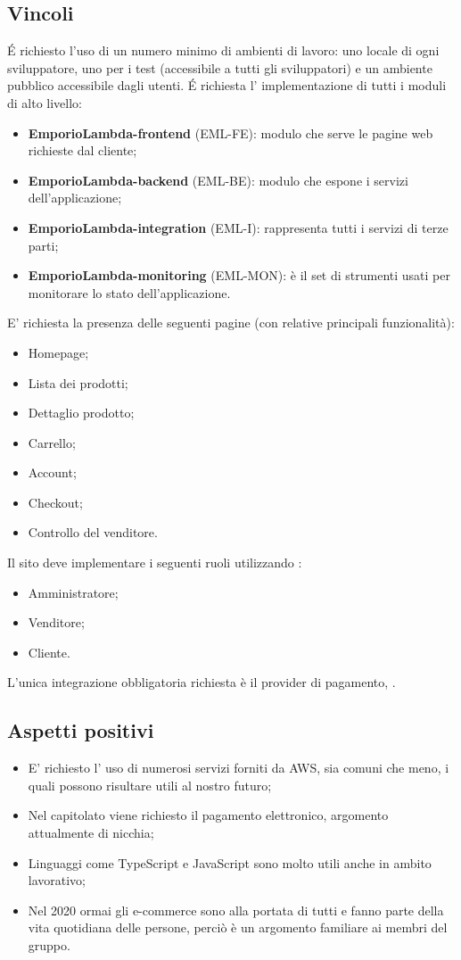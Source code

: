 \subsection{Vincoli}
É richiesto l'uso di un numero minimo di ambienti di lavoro: uno locale di ogni sviluppatore, uno per i test (accessibile a tutti gli sviluppatori) e un ambiente pubblico accessibile dagli utenti.
É richiesta l' implementazione di tutti i moduli di alto livello:
\begin{itemize}
\item	\textbf{EmporioLambda-frontend} (EML-FE): modulo che serve le pagine web richieste dal cliente;
\item	\textbf{EmporioLambda-backend} (EML-BE): modulo che espone i servizi dell'applicazione;
\item	\textbf{EmporioLambda-integration} (EML-I): rappresenta tutti i servizi di terze parti;
\item	\textbf{EmporioLambda-monitoring} (EML-MON): è il set di strumenti usati per monitorare lo stato dell'applicazione.
\end{itemize}
E' richiesta la presenza delle seguenti pagine (con relative principali funzionalità):
\begin{itemize}
\item	Homepage;
\item	Lista dei prodotti;
\item	Dettaglio prodotto;
\item	Carrello;
\item	Account;
\item	Checkout;
\item	Controllo del venditore.
\end{itemize}
Il sito deve implementare i seguenti ruoli utilizzando :
\begin{itemize}
\item	Amministratore;
\item	Venditore;
\item	Cliente.
\end{itemize}
L'unica integrazione obbligatoria richiesta è il provider di pagamento, .
\subsection{Aspetti positivi}
\begin{itemize}
\item	E' richiesto l' uso di numerosi servizi forniti da AWS, sia comuni che meno, i quali possono risultare utili al nostro futuro;
\item	Nel capitolato viene richiesto il pagamento elettronico, argomento attualmente di nicchia;
\item	Linguaggi come TypeScript e JavaScript sono molto utili anche in ambito lavorativo;
\item	Nel 2020 ormai gli e-commerce sono alla portata di tutti e fanno parte della vita quotidiana delle persone, perciò è un argomento familiare ai membri del gruppo.
\end{itemize}
